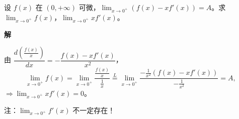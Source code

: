 \documentclass[lang=cn,chinesefont=founder,10pt]{elegantbook}
\renewenvironment{proof}[1][\proofname]{
  \par\noindent\textbf{\color{second}#1\;}\par\noindent
  \color{black!90}\cfs}{
  \par}
\begin{document}
\begin{example}
    设 $f(x)$ 在 $(0,+\infty)$ 可微，$\displaystyle\lim_{x \to 0^+} (f(x)-xf'(x)) = A$。求 $\displaystyle\lim_{x \to 0^+} f(x)$，$\displaystyle\lim_{x \to 0^+} xf'(x)$。
\end{example}

\begin{proof}[解]
    由 $\dfrac{d\left(\frac{f(x)}{x}\right)}{dx} = -\dfrac{f(x)-xf'(x)}{x^2}$，
    \[
        \lim_{x \to 0^+} f(x)
        = \lim_{x \to 0^+} \frac{\frac{f(x)}{x}}{\frac{1}{x}}
        \stackrel{L}{=} \lim_{x \to 0^+} \frac{-\frac{1}{x^2}(f(x)-xf'(x))}{-\frac{1}{x^2}}
        = A,
    \]
    $\Rightarrow \lim_{x \to 0^+} xf'(x) = 0$。
\end{proof}

\begin{remark}
    注：$\lim_{x \to 0^+} f'(x)$ 不一定存在！
\end{remark}
\end{document}
